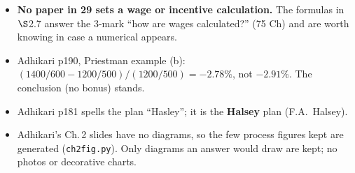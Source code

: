 \begin{itemize}
  \item \textbf{No paper in 29 sets a wage or incentive calculation.} The formulas in $\S$2.7
    answer the 3-mark ``how are wages calculated?'' (75 Ch) and are worth knowing in case a
    numerical appears.
\end{itemize}

\begin{itemize}
  \item Adhikari p190, Priestman example (b): $(1400/600 - 1200/500)/(1200/500) = -2.78\%$,
    not $-2.91\%$. The conclusion (no bonus) stands.
  \item Adhikari p181 spells the plan ``Hasley''; it is the \textbf{Halsey} plan (F.A.\ Halsey).
\end{itemize}

\begin{itemize}
  \item Adhikari's Ch.\,2 slides have no diagrams, so the few process figures kept are
    generated (\texttt{ch2fig.py}). Only diagrams an answer would draw are kept; no photos
    or decorative charts.
\end{itemize}
